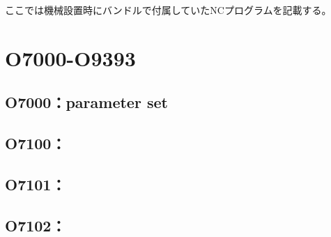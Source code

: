 
ここでは機械設置時にバンドルで付属していたNCプログラムを記載する。


\section{O7000-O9393}

\subsection{O7000：parameter set}



\clearpage
\subsection{O7100：}



\subsection{O7101：}



\clearpage
\subsection{O7102：}



